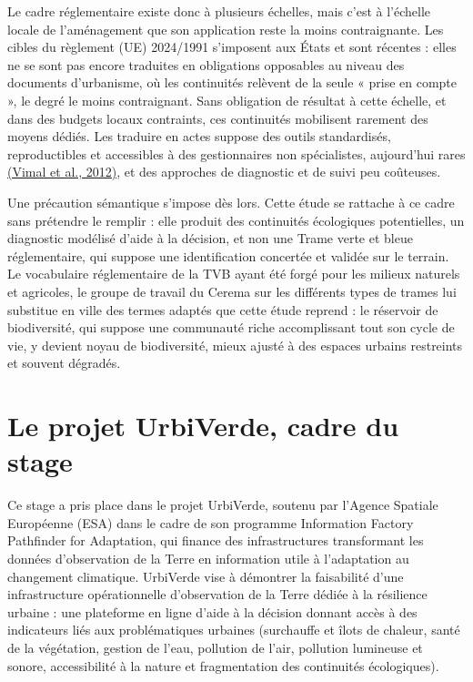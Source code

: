 \documentclass[a4paper,11pt]{report}
\begin{document}
Le cadre réglementaire existe donc à plusieurs échelles, mais c'est à l'échelle locale de l'aménagement que son application reste la moins contraignante. Les cibles du règlement (UE) 2024/1991 s'imposent aux États et sont récentes : elles ne se sont pas encore traduites en obligations opposables au niveau des documents d'urbanisme, où les continuités relèvent de la seule « prise en compte », le degré le moins contraignant. Sans obligation de résultat à cette échelle, et dans des budgets locaux contraints, ces continuités mobilisent rarement des moyens dédiés. Les traduire en actes suppose des outils standardisés, reproductibles et accessibles à des gestionnaires non spécialistes, aujourd'hui rares \hyperref[sec:bibliographie]{(Vimal et al., 2012)}, et des approches de diagnostic et de suivi peu coûteuses.

Une précaution sémantique s'impose dès lors. Cette étude se rattache à ce cadre sans prétendre le remplir : elle produit des continuités écologiques potentielles, un diagnostic modélisé d'aide à la décision, et non une Trame verte et bleue réglementaire, qui suppose une identification concertée et validée sur le terrain. Le vocabulaire réglementaire de la TVB ayant été forgé pour les milieux naturels et agricoles, le groupe de travail du Cerema sur les différents types de trames lui substitue en ville des termes adaptés que cette étude reprend : le réservoir de biodiversité, qui suppose une communauté riche accomplissant tout son cycle de vie, y devient noyau de biodiversité, mieux ajusté à des espaces urbains restreints et souvent dégradés.

\section{Le projet UrbiVerde, cadre du stage}\label{sec:1.4}

Ce stage a pris place dans le projet UrbiVerde, soutenu par l'Agence Spatiale Européenne (ESA) dans le cadre de son programme Information Factory Pathfinder for Adaptation, qui finance des infrastructures transformant les données d'observation de la Terre en information utile à l'adaptation au changement climatique. UrbiVerde vise à démontrer la faisabilité d'une infrastructure opérationnelle d'observation de la Terre dédiée à la résilience urbaine : une plateforme en ligne d'aide à la décision donnant accès à des indicateurs liés aux problématiques urbaines (surchauffe et îlots de chaleur, santé de la végétation, gestion de l'eau, pollution de l'air, pollution lumineuse et sonore, accessibilité à la nature et fragmentation des continuités écologiques).
\end{document}
